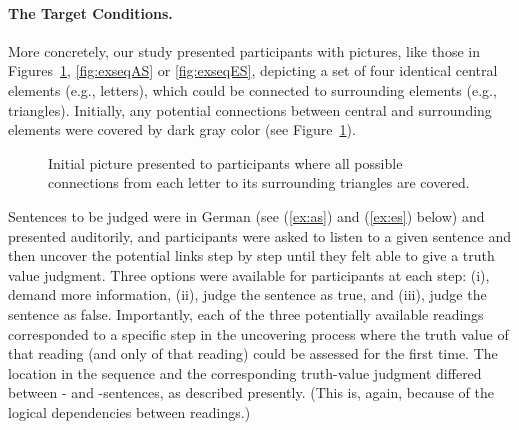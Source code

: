 \documentclass[fleqn,reqno,10pt,draft]{article}
\newcommand{\as}{\acro{as}}
\renewcommand{\es}{\acro{es}}
\begin{document}
\paragraph{The Target Conditions.} More concretely, our study
presented participants with pictures, like those in
Figures~\ref{fig:InitialPicture}, \ref{fig:exseqAS} or
\ref{fig:exseqES}, depicting a set of four identical central elements
(e.g., letters), which could be connected to surrounding elements
(e.g., triangles). Initially, any potential connections between
central and surrounding elements were covered by dark gray color (see
Figure~\ref{fig:InitialPicture}).
%
\begin{figure}
  \centering
      \caption{Initial picture presented to participants where all
        possible connections from each letter to its surrounding
        triangles are covered.}
  \label{fig:InitialPicture}
\end{figure}
%
Sentences to be judged were in German (see (\ref{ex:as}) and
(\ref{ex:es}) below) and presented auditorily, and participants were
asked to listen to a given sentence and then uncover the potential
links step by step until they felt able to give a truth value
judgment. Three options were available for participants at each step:
(i), demand more information, (ii), judge the sentence as true, and
(iii), judge the sentence as false. Importantly, each of the three
potentially available readings corresponded to a specific step in the
uncovering process where the truth value of that reading (and only of
that reading) could be assessed for the first time. The location in
the sequence and the corresponding truth-value judgment differed
between \as- and \es-sentences, as described presently. (This is,
again, because of the logical dependencies between readings.)
\end{document}
